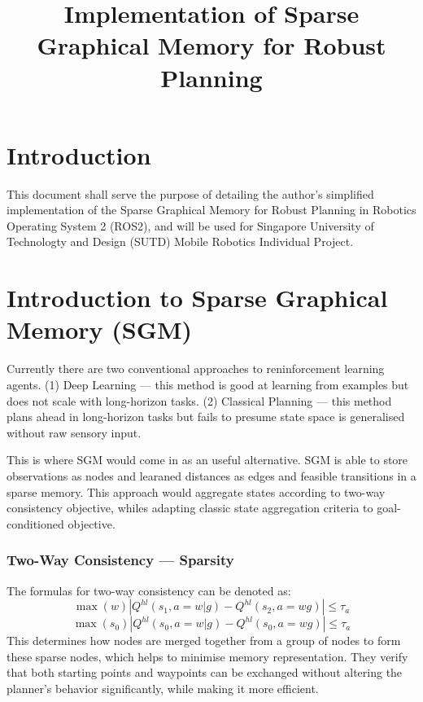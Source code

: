 \documentclass[conference]{IEEEtran}
\begin{document}
\title{Implementation of Sparse Graphical Memory for Robust Planning}

\author{
}

\maketitle

\section{Introduction}
This document shall serve the purpose of detailing the author's simplified implementation of the Sparse Graphical Memory for Robust Planning in Robotics Operating System 2 (ROS2), and will be used for Singapore University of Technologty and Design (SUTD) Mobile Robotics Individual Project.

\section{Introduction to Sparse Graphical Memory (SGM)}

Currently there are two conventional approaches to reninforcement learning agents. (1) Deep Learning --- this method is good at learning from examples but does not scale with long-horizon tasks. (2) Classical Planning --- this method plans ahead in long-horizon tasks but fails to presume state space is generalised without raw sensory input.

This is where SGM would come in as an useful alternative. SGM is able to store observations as nodes and learaned distances as edges and feasible transitions in a sparse memory. This approach would aggregate states according to two-way consistency objective, whiles adapting classic state aggregation criteria to goal-conditioned objective.

\subsubsection{Two-Way Consistency --- Sparsity}
The formulas for two-way consistency can be denoted as:
\begin{equation}
  \max(w) \left| Q^{hl}(s_1, a=w | g) - Q^{hl}(s_2, a=wg) \right| \leq \tau_a
  \label{1}
\end{equation}
\begin{equation}
  \max(s_0) \left| Q^{hl}(s_0, a=w | g) - Q^{hl}(s_0, a=wg) \right| \leq \tau_a
  \label{2}
\end{equation}
This determines how nodes are merged together from a group of nodes to form these sparse nodes, which helps to minimise memory representation. They verify that both starting points and waypoints can be exchanged without altering the planner's behavior significantly, while making it more efficient.
\end{document}
